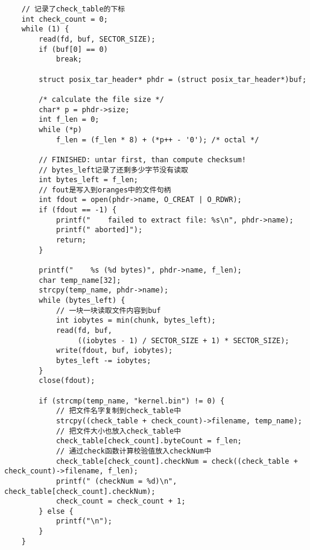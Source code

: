 \documentclass{whureport}
\begin{document}
\begin{lstlisting}
	// 记录了check_table的下标
    int check_count = 0;
    while (1) {
        read(fd, buf, SECTOR_SIZE);
        if (buf[0] == 0)
            break;

        struct posix_tar_header* phdr = (struct posix_tar_header*)buf;

        /* calculate the file size */
        char* p = phdr->size;
        int f_len = 0;
        while (*p)
            f_len = (f_len * 8) + (*p++ - '0'); /* octal */

        // FINISHED: untar first, than compute checksum!
        // bytes_left记录了还剩多少字节没有读取
        int bytes_left = f_len;
        // fout是写入到oranges中的文件句柄
        int fdout = open(phdr->name, O_CREAT | O_RDWR);
        if (fdout == -1) {
            printf("    failed to extract file: %s\n", phdr->name);
            printf(" aborted]");
            return;
        }

        printf("    %s (%d bytes)", phdr->name, f_len);
        char temp_name[32];
        strcpy(temp_name, phdr->name);
        while (bytes_left) {
        	// 一块一块读取文件内容到buf
            int iobytes = min(chunk, bytes_left);
            read(fd, buf,
                 ((iobytes - 1) / SECTOR_SIZE + 1) * SECTOR_SIZE);
            write(fdout, buf, iobytes);
            bytes_left -= iobytes;
        }
        close(fdout);

        if (strcmp(temp_name, "kernel.bin") != 0) {
        	// 把文件名字复制到check_table中
            strcpy((check_table + check_count)->filename, temp_name);
            // 把文件大小也放入check_table中
            check_table[check_count].byteCount = f_len;
            // 通过check函数计算校验值放入checkNum中
            check_table[check_count].checkNum = check((check_table + check_count)->filename, f_len);
            printf(" (checkNum = %d)\n", check_table[check_count].checkNum);
            check_count = check_count + 1;
        } else {
            printf("\n");
        }
    }
\end{lstlisting}
\end{document}
